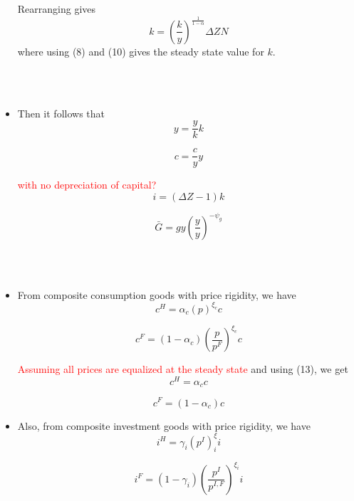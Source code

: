 \documentclass[11pt,titlepage]{article}
\begin{document}
\begin{itemize}
Rearranging gives
\begin{equation}
k = \left(\frac{k}{y}\right)^{\frac{1}{1-\alpha}} \Delta Z N
\end{equation}
where using (8) and (10) gives the steady state value for $k$.

~\\~

\item Then it follows that
\begin{equation}
y = \frac{y}{k}k
\end{equation}

\begin{equation}
c = \frac{c}{y}y
\end{equation}

\textcolor{red}{with no depreciation of capital?}
\begin{equation}
i = \left(\Delta Z -1\right)k
\end{equation}

\begin{equation}
\bar{G} = g y \left(\frac{y}{y}\right)^{-\psi_g}
\end{equation}

~\\~

\item From composite consumption goods with price rigidity, we have
\begin{equation*}
c^{H} = \alpha_c (p)^{\xi_c} c
\end{equation*}

\begin{equation*}
c^{F} = (1-\alpha_c) \left(\frac{p}{p^F}\right)^{\xi_c} c
\end{equation*}

\textcolor{red}{Assuming all prices are equalized at the steady state} and using (13), we get
\begin{equation}
c^{H} = \alpha_c c
\end{equation}

\begin{equation}
c^{F} = (1-\alpha_c) c
\end{equation}

\item Also, from composite investment goods with price rigidity, we have
\begin{equation*}
i^{H} = \gamma_i {\left(p^I \right)}^\xi_i i
\end{equation*}

\begin{equation*}
i^{F} = (1-\gamma_i) \left(\frac{p^I}{p^{I,F}}\right)^{\xi_{i}} i
\end{equation*}


\end{itemize}
\end{document}
